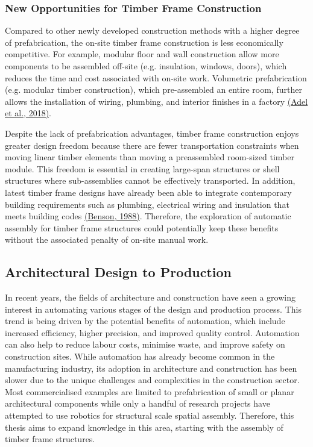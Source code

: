 \documentclass[11pt]{book}
\begin{document}
\subsubsection{New Opportunities for Timber Frame Construction}

Compared to other newly developed construction methods with a higher degree of prefabrication, the on-site timber frame construction is less economically competitive. For example, modular floor and wall construction allow more components to be assembled off-site (e.g. insulation, windows, doors), which reduces the time and cost associated with on-site work. Volumetric prefabrication (e.g. modular timber construction), which pre-assembled an entire room, further allows the installation of wiring, plumbing, and interior finishes in a factory \href{https://www.zotero.org/google-docs/?zzjLzT}{(Adel et al., 2018)}. 

Despite the lack of prefabrication advantages, timber frame construction enjoys greater design freedom because there are fewer transportation constraints when moving linear timber elements than moving a preassembled room-sized timber module. This freedom is essential in creating large-span structures or shell structures where sub-assemblies cannot be effectively transported. In addition, latest timber frame designs have already been able to integrate contemporary building requirements such as plumbing, electrical wiring and insulation that meets building codes \href{https://www.zotero.org/google-docs/?zzM1PB}{(Benson, 1988)}. Therefore, the exploration of automatic assembly for timber frame structures could potentially keep these benefits without the associated penalty of on-site manual work.

\subsection{Architectural Design to Production}

In recent years, the fields of architecture and construction have seen a growing interest in automating various stages of the design and production process. This trend is being driven by the potential benefits of automation, which include increased efficiency, higher precision, and improved quality control. Automation can also help to reduce labour costs, minimise waste, and improve safety on construction sites. While automation has already become common in the manufacturing industry, its adoption in architecture and construction has been slower due to the unique challenges and complexities in the construction sector. Most commercialised examples are limited to prefabrication of small or planar architectural components while only a handful of research projects have attempted to use robotics for structural scale spatial assembly. Therefore, this thesis aims to expand knowledge in this area, starting with the assembly of timber frame structures.
\end{document}
